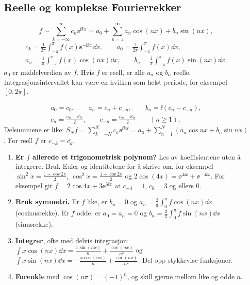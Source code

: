\subsection{Reelle og komplekse Fourierrekker}
\begin{formel}
\[
f\sim\sum_{k=-\infty}^{\infty}c_k\ee^{\ii kx}=a_0+\sum_{n=1}^\infty a_n\cos(nx)+b_n\sin(nx),
\]
\begin{gather*}
c_k=\frac1{2\pi}\int_{-\pi}^{\pi}f(x)\ee^{-\ii kx}\dd x,\qquad a_0=\frac1{2\pi}\int_{-\pi}^{\pi}f(x)\dd x,\\
a_n=\frac1\pi\int_{-\pi}^{\pi}f(x)\cos(nx)\dd x,\qquad b_n=\frac1\pi\int_{-\pi}^{\pi}f(x)\sin(nx)\dd x.
\end{gather*}
$a_0$ er middelverdien av $f$. Hvis $f$ er reell, er alle $a_n$ og $b_n$ reelle. Integrasjonsintervallet kan være en hvilken som helst periode, for eksempel $[0,2\pi]$.
\end{formel}

\begin{teorem}
\begin{gather*}
a_0=c_0,\qquad a_n=c_n+c_{-n},\qquad b_n=\ii(c_n-c_{-n}),\\ c_n=\frac{a_n-\ii b_n}{2},\qquad c_{-n}=\frac{a_n+\ii b_n}{2}\qquad(n\ge1).
\end{gather*}
Delsummene er like: $S_Nf=\sum_{k=-N}^N c_k\ee^{\ii kx}=a_0+\sum_{n=1}^N(a_n\cos nx+b_n\sin nx)$. For reell $f$ er $c_{-k}=\overline{c_k}$.
\end{teorem}

\begin{oppskrift}
\begin{enumerate}
  \item \textbf{Er $f$ allerede et trigonometrisk polynom?} Les av koeffisientene uten å integrere. Bruk Euler og identitetene for å skrive om, for eksempel $\sin^2x=\tfrac{1-\cos2x}2$, $\cos^2x=\tfrac{1+\cos2x}2$ og $2\cos(4x)=\ee^{4\ii x}+\ee^{-4\ii x}$. For eksempel gir $f=2\cos4x+3\ee^{6\ii x}$ at $c_{\pm4}=1$, $c_6=3$ og ellers $0$.
  \item \textbf{Bruk symmetri.} Er $f$ like, er $b_n=0$ og $a_n=\frac2\pi\int_0^\pi f\cos(nx)\dd x$ (cosinusrekke). Er $f$ odde, er $a_0=a_n=0$ og $b_n=\frac2\pi\int_0^\pi f\sin(nx)\dd x$ (sinusrekke).
  \item \textbf{Integrer}, ofte med delvis integrasjon: $\int x\cos(nx)\dd x=\frac{x\sin(nx)}n+\frac{\cos(nx)}{n^2}$ og $\int x\sin(nx)\dd x=-\frac{x\cos(nx)}n+\frac{\sin(nx)}{n^2}$. Del opp stykkevise funksjoner.
  \item \textbf{Forenkle} med $\cos(n\pi)=(-1)^n$, og skill gjerne mellom like og odde $n$.
\end{enumerate}
\end{oppskrift}

